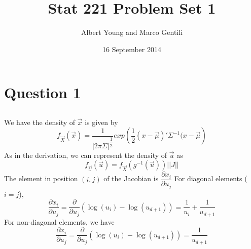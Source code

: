 \documentclass[10pt]{article}
\title{Stat 221 Problem Set 1}
\author{Albert Young and Marco Gentili}
\date{16 September 2014}
\begin{document}
\maketitle

\section{Question 1}
\subsection{}
We have the density of $\vec{x}$ is given by
\[f_{\vec{X}}(\vec{x}) = \dfrac{1}{\left|2\pi\Sigma\right|^{\dfrac{1}{2}}}exp\left(\dfrac{1}{2}(x-\vec{\mu})'\Sigma^{-1}(x-\vec{\mu}\right)\]
As in the derivation, we can represent the density of $\vec{u}$ as 
\[f_{\vec{U}}(\vec{u}) = f_{\vec{X}}(g^{-1}(\vec{u}))||J||\]
The element in position $(i,j)$ of the Jacobian is $\dfrac{\partial x_i}{\partial u_j}$
For diagonal elements ($i=j$),
\[\dfrac{\partial x_i}{\partial u_j} = \dfrac{ \partial}{\partial u_j}\left(\log(u_i) - \log(u_{d+1})\right) = \dfrac{1}{u_i} + \dfrac{1}{u_{d+1}}\]
For non-diagonal elements, we have 
\[\dfrac{\partial x_i}{\partial u_j} = \dfrac{ \partial}{\partial u_j}\left(\log(u_i) - \log(u_{d+1})\right) = \dfrac{1}{u_{d+1}}\]
\end{document}

